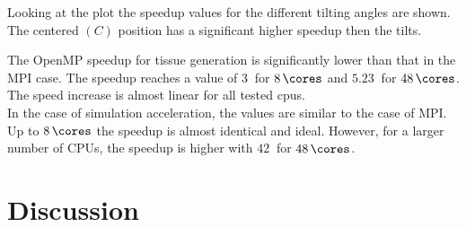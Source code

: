 Looking at the plot the speedup values for the different tilting angles are shown.
The centered $(C)$ position has a significant higher speedup then the tilts.
\par
%
The \ac{OpenMP} speedup for tissue generation is significantly lower than that in the \ac{MPI} case.
The speedup reaches a value of $\SI{3}{}$ for $\SI{8}{\cores}$ and $\SI{5.23}{}$ for $\SI{48}{\cores}$.
The speed increase is almost linear for all tested cpus.
\\
%
In the case of simulation acceleration, the values are similar to the case of \ac{MPI}.
Up to $\SI{8}{\cores}$ the speedup is almost identical and ideal.
However, for a larger number of \acsp{CPU}, the speedup is higher with $\SI{42}{}$ for $\SI{48}{\cores}$.
%
%
\section{Discussion}
%
